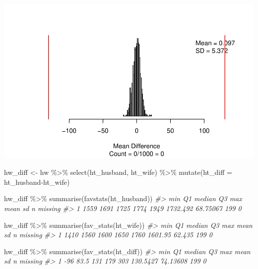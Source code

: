 \documentclass[
]{report}
\newenvironment{Shaded}{\begin{snugshade}}{\end{snugshade}}
\newcommand{\AttributeTok}[1]{\textcolor[rgb]{0.77,0.63,0.00}{#1}}
\newcommand{\CommentTok}[1]{\textcolor[rgb]{0.56,0.35,0.01}{\textit{#1}}}
\newcommand{\FunctionTok}[1]{\textcolor[rgb]{0.00,0.00,0.00}{#1}}
\newcommand{\NormalTok}[1]{#1}
\newcommand{\OtherTok}[1]{\textcolor[rgb]{0.56,0.35,0.01}{#1}}
\newcommand{\SpecialCharTok}[1]{\textcolor[rgb]{0.00,0.00,0.00}{#1}}
\begin{document}
\begin{center}\includegraphics[width=0.7\linewidth]{11-LN011-paired_files/figure-latex/unnamed-chunk-9-1} \end{center}

\begin{Shaded}
\begin{Highlighting}[]
\NormalTok{hw\_diff }\OtherTok{\textless{}{-}}\NormalTok{ hw }\SpecialCharTok{\%\textgreater{}\%}
  \FunctionTok{select}\NormalTok{(ht\_husband, ht\_wife) }\SpecialCharTok{\%\textgreater{}\%}
  \FunctionTok{mutate}\NormalTok{(}\AttributeTok{ht\_diff =}\NormalTok{ ht\_husband}\SpecialCharTok{{-}}\NormalTok{ht\_wife)}
\end{Highlighting}
\end{Shaded}

\begin{Shaded}
\begin{Highlighting}[]
\NormalTok{hw\_diff }\SpecialCharTok{\%\textgreater{}\%}
    \FunctionTok{summarise}\NormalTok{(}\FunctionTok{favstats}\NormalTok{(ht\_husband))}
\CommentTok{\#\textgreater{}    min   Q1 median   Q3  max     mean       sd   n missing}
\CommentTok{\#\textgreater{} 1 1559 1691   1725 1774 1949 1732.492 68.75067 199       0}
\end{Highlighting}
\end{Shaded}

\begin{Shaded}
\begin{Highlighting}[]
\NormalTok{hw\_diff }\SpecialCharTok{\%\textgreater{}\%}
    \FunctionTok{summarise}\NormalTok{(}\FunctionTok{fav\_stats}\NormalTok{(ht\_wife))}
\CommentTok{\#\textgreater{}    min   Q1 median   Q3  max    mean     sd   n missing}
\CommentTok{\#\textgreater{} 1 1410 1560   1600 1650 1760 1601.95 62.435 199       0}
\end{Highlighting}
\end{Shaded}

\begin{Shaded}
\begin{Highlighting}[]
\NormalTok{hw\_diff }\SpecialCharTok{\%\textgreater{}\%}
    \FunctionTok{summarise}\NormalTok{(}\FunctionTok{fav\_stats}\NormalTok{(ht\_diff))}
\CommentTok{\#\textgreater{}   min   Q1 median  Q3 max     mean       sd   n missing}
\CommentTok{\#\textgreater{} 1 {-}96 83.5    131 179 303 130.5427 74.13608 199       0}
\end{Highlighting}
\end{Shaded}
\end{document}
